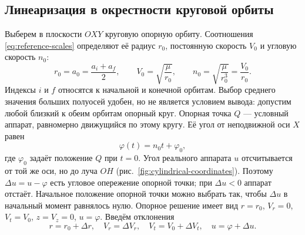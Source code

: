 \documentclass[a4paper,11pt]{article}
\numberwithin{equation}{section}
\theoremstyle{remark}
\begin{document}
\subsection{Линеаризация в окрестности круговой орбиты}

Выберем в плоскости $OXY$ круговую опорную орбиту.
Соотношения \eqref{eq:reference-scales} определяют её радиус $r_0$,
постоянную скорость $V_0$ и угловую скорость $n_0$:
\begin {equation}
 r_0=a_0=\frac{{a_i+a_f}}{{2}},\qquad
 V_0=\sqrt{\frac{{\mu}}{{r_0}}},\qquad
 n_0=\sqrt{\frac{{\mu}}{{r_0^3}}}=\frac{{V_0}}{{r_0}}.
 \label {eq:reference-scales}
\end {equation}
Индексы $i$ и $f$ относятся к начальной и конечной орбитам.
Выбор среднего значения больших полуосей удобен, но не является
условием вывода: допустим любой близкий к обеим орбитам опорный круг.
Опорная точка $Q$ --- условный аппарат, равномерно движущийся
по этому кругу. Её угол от неподвижной оси $X$ равен
\[
 \varphi(t)=n_0t+\varphi_0,
\]
где $\varphi_0$ задаёт положение $Q$ при $t=0$.
Угол реального аппарата $u$ отсчитывается от той же оси, но до
луча $OH$ (рис.~\ref{fig:cylindrical-coordinates}). Поэтому
$\Delta u=u-\varphi$ есть угловое опережение опорной точки;
при $\Delta u<0$ аппарат отстаёт. Начальное положение опорной точки можно
выбрать так, чтобы $\Delta u$ в начальный момент равнялось нулю.
Опорное решение имеет вид
$r=r_0$, $V_r=0$, $V_t=V_0$, $z=V_z=0$, $u=\varphi$.
Введём отклонения
\[
 r=r_0+\Delta r,\quad V_r=\Delta V_r,\quad
 V_t=V_0+\Delta V_t,\quad u=\varphi+\Delta u.
\]
\end{document}
